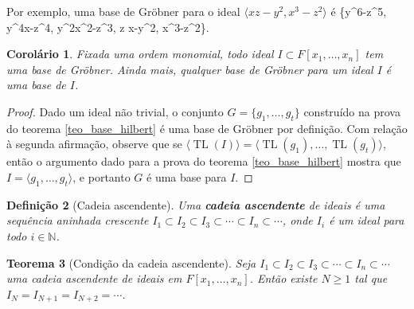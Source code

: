 \documentclass[12pt,a4paper]{report}
\newcommand{\N}{\mathbb{N}}
\newtheorem{theorem}{Teorema}
\newtheorem{definition}[theorem]{Definição}
\newtheorem{corollary}[theorem]{Corolário}
\numberwithin{theorem}{chapter}
\DeclareMathOperator{\TL}{TL}
\begin{document}
Por exemplo, uma base de Gröbner para o ideal \(\langle xz-y^2,
x^3-z^2 \rangle\) é \{y^6-z^5, y^4x-z^4, y^2x^2-z^3, z x-y^2,
x^3-z^2\}.

\begin{corollary}
  Fixada uma ordem monomial, todo ideal \(I \subset
  F[x_1,\ldots,x_n]\) tem uma base de Gröbner.  Ainda mais, qualquer
  base de Gröbner para um ideal \(I\) é uma base de \(I\).
\end{corollary}

\begin{proof}
  Dado um ideal não trivial, o conjunto \(G = \{g_1,\ldots,g_t\}\)
  construído na prova do teorema \ref{teo_base_hilbert} é uma base de
  Gröbner por definição.  Com relação à segunda afirmação, observe que
  se \(\langle \TL(I) \rangle = \langle \TL(g_1),\ldots,\TL(g_t)
  \rangle\), então o argumento dado para a prova do teorema
  \ref{teo_base_hilbert} mostra que \(I = \langle g_1,\ldots,g_t
  \rangle\), e portanto \(G\) é uma base para \(I\).
\end{proof}

\begin{definition}[Cadeia ascendente]
  Uma \textbf{cadeia ascendente} de ideais é uma sequência aninhada
  crescente \(I_1 \subset I_2 \subset I_3 \subset \cdots \subset I_n
  \subset \cdots\), onde \(I_i\) é um ideal para todo \(i \in \N\).
\end{definition}

\begin{theorem}[Condição da cadeia ascendente]
  Seja \(I_1 \subset I_2 \subset I_3 \subset \cdots \subset I_n
  \subset \cdots\) uma cadeia ascendente de ideais em
  \(F[x_1,\ldots,x_n]\).  Então existe \(N \geq 1\) tal que \(I_N =
  I_{N+1} = I_{N+2} = \cdots\).
\end{theorem}
\end{document}
